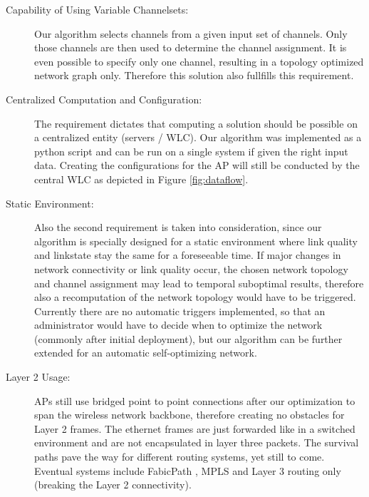 \begin{description}
	\item[Capability of Using Variable Channelsets:]
	  Our algorithm selects channels from a given input set of channels.
	  Only those channels are then used to determine the channel assignment.
	  It is even possible to specify only one channel, resulting in a topology optimized network graph only.
	  Therefore this solution also fullfills this requirement.  
	  
	\item[Centralized Computation and Configuration:]
	  The requirement dictates that computing a solution should be possible on a centralized entity (servers / \ac{WLC}).
	  Our algorithm was implemented as a python script and can be run on a single system if given the right input data.
	  Creating the configurations for the \ac{AP} will still be conducted by the central WLC as depicted in Figure \ref{fig:dataflow}.
	  
	\item[Static Environment:]
	  Also the second requirement is taken into consideration, since our algorithm is specially designed for a static environment where link quality 
	  and linkstate stay the same for a foreseeable time.
	  If major changes in network connectivity or link quality occur, the chosen network topology and channel assignment may lead to temporal suboptimal results,
	  therefore also a recomputation of the network topology would have to be triggered.
	  Currently there are no automatic triggers implemented, so that an administrator would have to decide when to optimize the network (commonly after initial deployment),
	  but our algorithm can be further extended for an automatic self-optimizing network.
	  
	\item[Layer 2 Usage:]
	  APs still use bridged point to point connections after our optimization to span the wireless network backbone, therefore creating no obstacles for Layer 2 frames.
	  The ethernet frames are just forwarded like in a switched environment and are not encapsulated in layer three packets.
	  The survival paths pave the way for different routing systems, yet still to come. Eventual systems include FabicPath \cite{fabricpath}, \ac{MPLS} \cite{mpls} and 
	  Layer 3 routing only (breaking the Layer 2 connectivity).
	  

\end{description}
